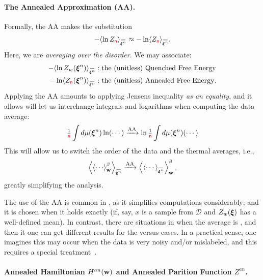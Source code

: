 \paragraph{The Annealed Approximation (AA).} 
Formally, the AA makes the substitution
\begin{align}
\label{eqn:AA}
-\langle\ln Z_{\ND}\rangle_{\AVGNDXIn}\approx-\ln \langle Z_{\ND}\rangle_{\AVGNDXIn}.
\end{align}
Here, we are \emph{averaging over the disorder}.
We may associate: 
\begin{eqnarray*}
    -\langle\ln Z_w(\NDXIn)\rangle_{\AVGNDXIn} &: \mbox{the (unitless) \Quenched \FreeEnergy} \\
    -\ln \langle Z_{\ND}(\NDXIn)\rangle_{\AVGNDXIn} &: \mbox{the (unitless) \Annealed \FreeEnergy}.
\end{eqnarray*}
Applying the AA amounts to applying Jensens inequality \emph{as an equality}, 
and it allows will let us interchange integrals and logarithms when computing the data average:
\begin{align}
\label{eqn:Jensens}
\tfrac{1}{{\color{red}\sf{n}}}\int d\mu(\boldsymbol{\xi}^{n})\ln(\cdots)   
\xrightarrow {\text{AA}}
\ln\tfrac{1}{{\color{red}\sf{n}}}\int d\mu(\boldsymbol{\xi}^{n})(\cdots)
\end{align}
This will allow us to switch the order of the data and the thermal averages, i.e.,
\begin{align}
\label{eqn:switch}
\left\langle \THRMAVGw{\cdots} \right\rangle_{\AVGNDXIn}
\xrightarrow{\text{AA}}
\THRMAVGw{\left\langle \cdots \right\rangle_{\AVGNDXIn}},
\end{align}
greatly simplifying the analysis.

The use of the AA is common in \STATMECH, as it simplifies computations considerably; and 
it is chosen when it holds exactly (if, say, $x$ is a \Typical sample from $\mathcal{D}$ and $Z_w(\boldsymbol{\xi})$ has a well-defined mean).
In contrast, there are situations in \STATMECH when the average is \ATypical, and then it one can get different results for the \Quenched versus \Annealed cases.  In a practical sense, one imagines this may occur when the data is very
noisy and/or mislabeled, and this requires a special treatment~\cite{SST92}.

\paragraph{Annealed Hamiltonian $H^{an}({\mathbf{w}})$ and Annealed Parition Function $Z^{an}$.}

